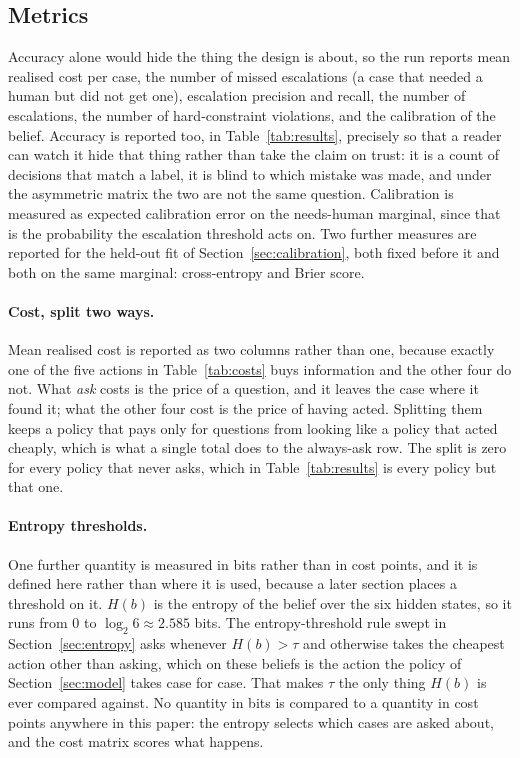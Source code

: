 \documentclass{article}
\begin{document}
\subsection{Metrics}
Accuracy alone would hide the thing the design is about, so the run reports mean
realised cost per case, the number of missed escalations (a case that needed a
human but did not get one), escalation precision and recall, the number of
escalations, the number of hard-constraint violations, and the calibration of the
belief. Accuracy is reported too, in Table~\ref{tab:results}, precisely so that a
reader can watch it hide that thing rather than take the claim on trust: it is a
count of decisions that match a label, it is blind to which mistake was made, and
under the asymmetric matrix the two are not the same question. Calibration is
measured as expected calibration error on the needs-human marginal, since that is the
probability the escalation threshold acts on. Two further measures are reported for
the held-out fit of Section~\ref{sec:calibration}, both fixed before it and both on
the same marginal: cross-entropy and Brier score.

\paragraph{Cost, split two ways.} Mean realised cost is reported as two columns
rather than one, because exactly one of the five actions in Table~\ref{tab:costs}
buys information and the other four do not. What \emph{ask} costs is the price of a
question, and it leaves the case where it found it; what the other four cost is the
price of having acted. Splitting them keeps a policy that pays only for questions
from looking like a policy that acted cheaply, which is what a single total does to
the always-ask row. The split is zero for every policy that never asks, which in
Table~\ref{tab:results} is every policy but that one.

\paragraph{Entropy thresholds.} One further quantity is measured in bits rather
than in cost points, and it is defined here rather than where it is used, because a
later section places a threshold on it. $H(b)$ is the entropy of the belief over
the six hidden states, so it runs from 0 to $\log_2 6 \approx 2.585$ bits. The
entropy-threshold rule swept in Section~\ref{sec:entropy} asks whenever
$H(b) > \tau$ and otherwise takes the cheapest action other than asking, which on
these beliefs is the action the policy of Section~\ref{sec:model} takes case for
case. That makes $\tau$ the
only thing $H(b)$ is ever compared against. No quantity in bits is compared to a
quantity in cost points anywhere in this paper: the entropy selects which cases are
asked about, and the cost matrix scores what happens.
\end{document}
